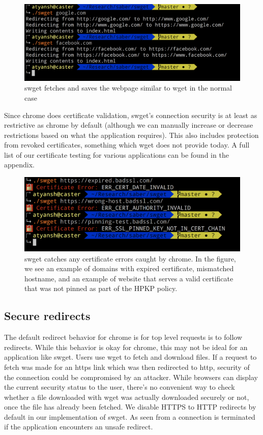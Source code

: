 \begin{figure}[h]
  \includegraphics[width=\textwidth]{figures/regular}
  \caption[Regular usage of swget]{swget fetches and saves the webpage similar
  to wget in the normal case}
  \label{fig:regular-saber}
\end{figure}

Since chrome does certificate validation, swget's connection security is at
least as restrictive as chrome by default (although we can manually increase or
decrease restrictions based on what the application requires). This also
includes protection from revoked certificates, something which wget does not
provide today. A full list of our certificate testing for various applications
can be found in the appendix.

\begin{figure}[h]
  \includegraphics[width=\textwidth]{figures/cert-error}
  \caption[Behavior on certificate errors]{swget catches any certificate errors
  caught by chrome. In the figure, we see an example of domains with expired
  certificate, mismatched hostname, and an example of website that serves a
  valid certificate that was not pinned as part of the HPKP policy.} 
  \label{fig:cert-error-saber}
\end{figure}


\subsection{Secure redirects}
The default redirect behavior for chrome is for top level requests is to follow
redirects. While this behavior is okay for chrome, this may not be ideal for an
application like swget. Users use wget to fetch and download files. If a
request to fetch was made for an https link which was then redirected to http,
security of the connection could be compromised by an attacker. While browsers
can display the current security status to the user, there's no convenient way
to check whether a file downloaded with wget was actually downloaded securely
or not, once the file has already been fetched. We disable HTTPS to HTTP
redirects by default in our implementation of swget. As seen from
 a connection is terminated if the application
encounters an unsafe redirect.

